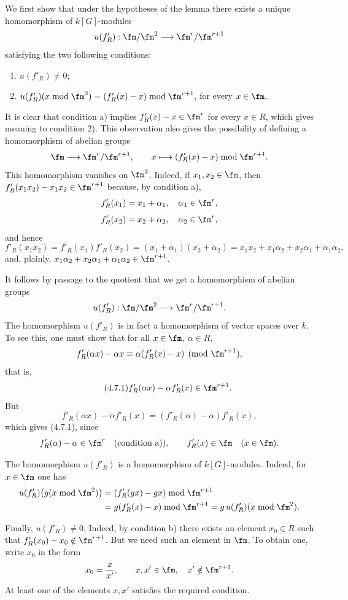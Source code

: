 We first show that under the hypotheses of the lemma there exists a unique homomorphism of $k[G]$-modules
\[
u(f'_R):\fm/\fm^2\longrightarrow \fm^r/\fm^{r+1}
\]
satisfying the two following conditions:
\begin{enumerate}
\item[1)] $u(f'_R)\ne0$;
\item[2)] $u(f'_R)(x\bmod \fm^2)=(f'_R(x)-x)\bmod \fm^{r+1}$, for every $x\in\fm$.
\end{enumerate}
It is clear that condition a) implies $f'_R(x)-x\in\fm^r$ for every $x\in R$, which gives meaning to condition 2). This observation also gives the possibility of defining a homomorphism of abelian groups
\[
\fm\longrightarrow \fm^r/\fm^{r+1},
\qquad
x\longmapsto (f'_R(x)-x)\bmod \fm^{r+1}.
\]
This homomorphism vanishes on $\fm^2$. Indeed, if $x_1,x_2\in\fm$, then $f'_R(x_1x_2)-x_1x_2\in\fm^{r+1}$ because, by condition a),
\[
f'_R(x_1)=x_1+\alpha_1,
\quad \alpha_1\in\fm^r,
\]
\[
f'_R(x_2)=x_2+\alpha_2,
\quad \alpha_2\in\fm^r,
\]
and hence
\[
f'_R(x_1x_2)=f'_R(x_1)f'_R(x_2)=(x_1+\alpha_1)(x_2+\alpha_2)
=x_1x_2+x_1\alpha_2+x_2\alpha_1+\alpha_1\alpha_2,
\]
and, plainly, $x_1\alpha_2+x_2\alpha_1+\alpha_1\alpha_2\in\fm^{r+1}$.

It follows by passage to the quotient that we get a homomorphism of abelian groups
\[
u(f'_R):\fm/\fm^2\longrightarrow \fm^r/\fm^{r+1}.
\]
The homomorphism $u(f'_R)$ is in fact a homomorphism of vector spaces over $k$. To see this, one must show that for all $x\in\fm$, $\alpha\in R$,
\[
f'_R(\alpha x)-\alpha x\equiv \alpha(f'_R(x)-x)\pmod{\fm^{r+1}},
\]
that is,
\begin{equation}
\tag{4.7.1}
f'_R(\alpha x)-\alpha f'_R(x)\in\fm^{r+1}.
\end{equation}
But
\[
f'_R(\alpha x)-\alpha f'_R(x)=(f'_R(\alpha)-\alpha)f'_R(x),
\]
which gives (4.7.1), since
\[
f'_R(\alpha)-\alpha\in\fm^r\quad\text{(condition a))},
\qquad
f'_R(x)\in\fm\quad(x\in\fm).
\]

The homomorphism $u(f'_R)$ is a homomorphism of $k[G]$-modules. Indeed,
for $x\in\fm$ one has
\[
\begin{aligned}
u(f'_R)\bigl(g(x\bmod\fm^2)\bigr)
&=(f'_R(gx)-gx)\bmod\fm^{r+1}\\
&=g(f'_R(x)-x)\bmod\fm^{r+1}
=g\,u(f'_R)(x\bmod\fm^2).
\end{aligned}
\]

Finally, $u(f'_R)\ne0$. Indeed, by condition b) there exists an element
$x_0\in R$ such that $f'_R(x_0)-x_0\notin\fm^{r+1}$. But we need such an
element in $\fm$. To obtain one, write $x_0$ in the form
\[
x_0=\frac{x}{x'},\qquad x,x'\in\fm,\quad x'\notin\fm^{r+1}.
\]
At least one of the elements $x,x'$ satisfies the required condition.

